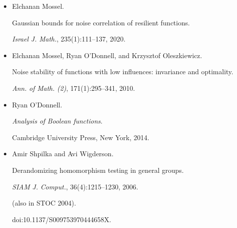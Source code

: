 \documentclass[10pt,a4paper]{article}
\begin{document}
\begin{itemize}
\item[] 
[26]

Elchanan Mossel.


Gaussian bounds for noise correlation of resilient functions.


\emph{Israel J. Math.}, 235(1):111–137, 2020.





\item[] 
[27]

Elchanan Mossel, Ryan O’Donnell, and Krzysztof Oleszkiewicz.


Noise stability of functions with low influences: invariance and
optimality.


\emph{Ann. of Math. (2)}, 171(1):295–341, 2010.





\item[] 
[28]

Ryan O’Donnell.


\emph{Analysis of Boolean functions}.


Cambridge University Press, New York, 2014.





\item[] 
[29]

Amir Shpilka and Avi Wigderson.


Derandomizing homomorphism testing in general groups.


\emph{SIAM J. Comput.}, 36(4):1215–1230, 2006.


(also in STOC 2004).


doi:10.1137/S009753970444658X.





\end{itemize}
\end{document}
